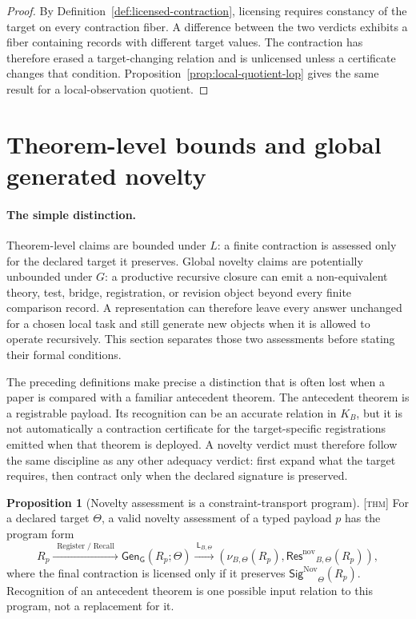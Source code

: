 \documentclass[11pt]{article}
\newcommand{\Register}{\ensuremath{\operatorname{Register}}}
\newcommand{\Recall}{\ensuremath{\operatorname{Recall}}}
\newcommand{\GOp}{\ensuremath{\mathsf{G}}}
\newcommand{\LOp}{\ensuremath{\mathsf{L}}}
\newcommand{\GenClos}{\ensuremath{\mathsf{Gen}_{\GOp}}}
\newcommand{\NovSig}{\ensuremath{\mathsf{Sig}^{\mathrm{Nov}}}}
\newcommand{\NovRes}{\ensuremath{\mathsf{Res}^{\mathrm{nov}}}}
\newcommand{\Thm}{\textsc{[thm]}}
\theoremstyle{definition}
\newtheorem{sproposition}{Proposition}
\begin{document}
\begin{proof}
By Definition~\ref{def:licensed-contraction}, licensing requires constancy of the
target on every contraction fiber. A difference between the two verdicts exhibits a
fiber containing records with different target values. The contraction has therefore
erased a target-changing relation and is unlicensed unless a certificate changes
that condition. Proposition~\ref{prop:local-quotient-lop} gives the same result
for a local-observation quotient.
\end{proof}

\section{Theorem-level bounds and global generated novelty}
\label{supp:novelty}

\paragraph{The simple distinction.}
Theorem-level claims are bounded under $L$: a finite contraction is assessed only
for the declared target it preserves. Global novelty claims are potentially
unbounded under $G$: a productive recursive closure can emit a non-equivalent
theory, test, bridge, registration, or revision object beyond every finite
comparison record. A representation can therefore leave every answer unchanged for
a chosen local task and still generate new objects when it is allowed to operate
recursively. This section separates those two assessments before stating their
formal conditions.

The preceding definitions make precise a distinction that is often lost when a
paper is compared with a familiar antecedent theorem. The antecedent theorem is a
registrable payload. Its recognition can be an accurate relation in $K_B$, but it
is not automatically a contraction certificate for the target-specific
registrations emitted when that theorem is deployed. A novelty verdict must
therefore follow the same discipline as any other adequacy verdict: first expand
what the target requires, then contract only when the declared signature is
preserved.

\begin{sproposition}[Novelty assessment is a constraint-transport program]
\label{prop:novelty-transport-program}
\Thm{} For a declared target $\Theta$, a valid novelty assessment of a typed
payload $p$ has the program form
\begin{equation}
R_p
\xrightarrow{\ \Register/\Recall\ }
\GenClos(R_p;\Theta)
\xrightarrow{\ \LOp_{B,\Theta}\ }
\left(\nu_{B,\Theta}(R_p),\NovRes_{B,\Theta}(R_p)\right),
\label{eq:novelty-transport-program}
\end{equation}
where the final contraction is licensed only if it preserves
$\NovSig_{\Theta}(R_p)$. Recognition of an antecedent theorem is one possible
input relation to this program, not a replacement for it.
\end{sproposition}
\end{document}
